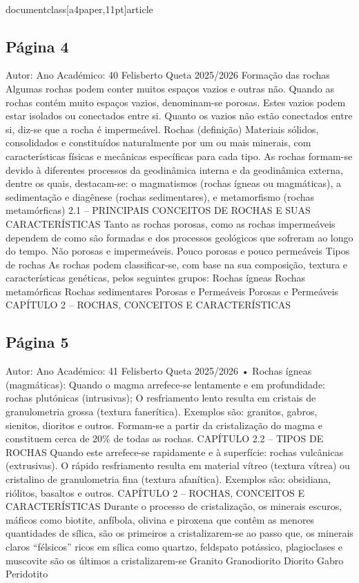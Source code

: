 \\documentclass[a4paper,11pt]{article}
\begin{document}
\subsection*{Página 4}
Autor:
Ano Académico:
40
Felisberto Queta
2025/2026
Formação das rochas
Algumas rochas podem conter muitos espaços vazios e outras não.
Quando as rochas contém muito espaços vazios, denominam-se porosas.
Estes vazios podem estar isolados ou conectados entre si. Quanto os vazios
não estão conectados entre si, diz-se que a rocha é impermeável.
Rochas (definição)
Materiais sólidos, consolidados
e
constituídos
naturalmente
por um ou mais minerais, com
características
físicas
e
mecânicas
específicas
para
cada tipo.
As rochas formam-se devido à
diferentes
processos
da
geodinâmica
interna
e
da
geodinâmica
externa,
dentre
os
quais,
destacam-se:
o
magmatismos (rochas ígneas
ou
magmáticas),
a
sedimentação
e
diagênese
(rochas
sedimentares),
e
metamorfismo
(rochas
metamórficas)
2.1 – PRINCIPAIS CONCEITOS DE ROCHAS E SUAS CARACTERÍSTICAS
Tanto as rochas porosas, como as rochas impermeáveis dependem de
como são formadas e dos processos geológicos que sofreram ao longo do
tempo.
Não porosas e
impermeáveis.
Pouco
porosas
e
pouco permeáveis
Tipos de rochas
As rochas podem classificar-se, com base na sua composição, textura e 
características genéticas, pelos seguintes grupos:
Rochas ígneas
Rochas metamórficas
Rochas sedimentares
Porosas
e
Permeáveis
Porosas
e
Permeáveis
CAPÍTULO 2 – ROCHAS, CONCEITOS E CARACTERÍSTICAS



\subsection*{Página 5}
Autor:
Ano Académico:
41
Felisberto Queta
2025/2026
•
Rochas ígneas (magmáticas):
Quando o magma arrefece-se lentamente e em profundidade: rochas plutónicas (intrusivas);
O resfriamento lento resulta em cristais de granulometria grossa (textura fanerítica). Exemplos são: 
granitos, gabros, sienitos, dioritos e outros.
Formam-se a partir da cristalização do magma e constituem cerca de 20\% de todas as rochas.
CAPÍTULO 2.2 – TIPOS DE ROCHAS
Quando este arrefece-se rapidamente e à superfície: rochas vulcânicas (extrusivas).
O rápido resfriamento resulta em material vítreo (textura vítrea) ou cristalino de granulometria fina 
(textura afanítica). Exemplos são: obsidiana, riólitos, basaltos e outros.
CAPÍTULO 2 – ROCHAS, CONCEITOS E CARACTERÍSTICAS
Durante o processo de cristalização, os minerais escuros, máficos como biotite, anfíbola, olivina e piroxena
que contêm as menores quantidades de sílica, são os primeiros a  cristalizarem-se ao passo que, os minerais
claros “félsicos” ricos em sílica como quartzo, feldspato potássico, plagioclases e muscovite são os
últimos a cristalizarem-se
Granito
Granodiorito
Diorito
Gabro
Peridotito
\end{document}
